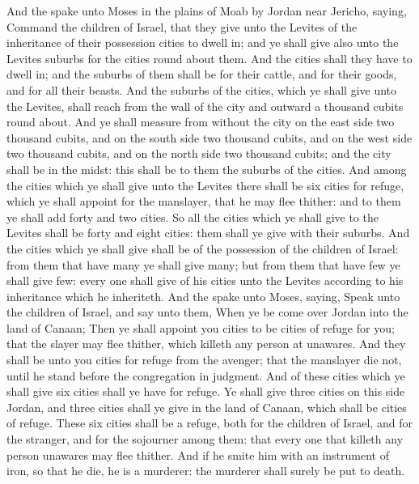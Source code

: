 \begin{biblechapter} %
 And the \LORD spake unto Moses in the plains of Moab by Jordan near Jericho, saying,
\verse Command the children of Israel, that they give unto the Levites of the inheritance of their possession cities to dwell in; and ye shall give also unto the Levites suburbs for the cities round about them.
\verse And the cities shall they have to dwell in; and the suburbs of them shall be for their cattle, and for their goods, and for all their beasts.
\verse And the suburbs of the cities, which ye shall give unto the Levites, shall reach from the wall of the city and outward a thousand cubits round about.
\verse And ye shall measure from without the city on the east side two thousand cubits, and on the south side two thousand cubits, and on the west side two thousand cubits, and on the north side two thousand cubits; and the city shall be in the midst: this shall be to them the suburbs of the cities.
 And among the cities which ye shall give unto the Levites there shall be six cities for refuge, which ye shall appoint for the manslayer, that he may flee thither: and to them ye shall add forty and two cities.
\verse So all the cities which ye shall give to the Levites shall be forty and eight cities: them shall ye give with their suburbs.
\verse And the cities which ye shall give shall be of the possession of the children of Israel: from them that have many ye shall give many; but from them that have few ye shall give few: every one shall give of his cities unto the Levites according to his inheritance which he inheriteth.
\verse And the \LORD spake unto Moses, saying,
\verse Speak unto the children of Israel, and say unto them, When ye be come over Jordan into the land of Canaan;
\verse Then ye shall appoint you cities to be cities of refuge for you; that the slayer may flee thither, which killeth any person at unawares.
\verse And they shall be unto you cities for refuge from the avenger; that the manslayer die not, until he stand before the congregation in judgment.
\verse And of these cities which ye shall give six cities shall ye have for refuge.
\verse Ye shall give three cities on this side Jordan, and three cities shall ye give in the land of Canaan, which shall be cities of refuge.
\verse These six cities shall be a refuge, both for the children of Israel, and for the stranger, and for the sojourner among them: that every one that killeth any person unawares may flee thither.
\verse And if he smite him with an instrument of iron, so that he die, he is a murderer: the murderer shall surely be put to death.

\end{biblechapter}
